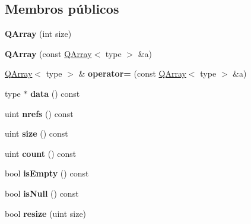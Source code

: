 \subsection*{Membros públicos}
\begin{DoxyCompactItemize}
\item 
\hypertarget{class_q_array_a648f25165a71f521aa5c9252ee535d8a}{{\bfseries Q\-Array} (int size)}\label{class_q_array_a648f25165a71f521aa5c9252ee535d8a}

\item 
\hypertarget{class_q_array_ad627fde1911b655d4c9e68703cb0a1d6}{{\bfseries Q\-Array} (const \hyperlink{class_q_array}{Q\-Array}$<$ type $>$ \&a)}\label{class_q_array_ad627fde1911b655d4c9e68703cb0a1d6}

\item 
\hypertarget{class_q_array_ad2ca538e93e90b600512b84d081164c6}{\hyperlink{class_q_array}{Q\-Array}$<$ type $>$ \& {\bfseries operator=} (const \hyperlink{class_q_array}{Q\-Array}$<$ type $>$ \&a)}\label{class_q_array_ad2ca538e93e90b600512b84d081164c6}

\item 
\hypertarget{class_q_array_a3c89c9a75d2ce89c64d6e209da7d0982}{type $\ast$ {\bfseries data} () const }\label{class_q_array_a3c89c9a75d2ce89c64d6e209da7d0982}

\item 
\hypertarget{class_q_array_af039b996f5fd2708ee64084d6e867649}{uint {\bfseries nrefs} () const }\label{class_q_array_af039b996f5fd2708ee64084d6e867649}

\item 
\hypertarget{class_q_array_a7e63723212bed1ca52f0fe57e58b812e}{uint {\bfseries size} () const }\label{class_q_array_a7e63723212bed1ca52f0fe57e58b812e}

\item 
\hypertarget{class_q_array_a774149fc271ebaba2aabcd183a836e8f}{uint {\bfseries count} () const }\label{class_q_array_a774149fc271ebaba2aabcd183a836e8f}

\item 
\hypertarget{class_q_array_a479432127ee77145cc19d6a2d1590821}{bool {\bfseries is\-Empty} () const }\label{class_q_array_a479432127ee77145cc19d6a2d1590821}

\item 
\hypertarget{class_q_array_ac02f2a4d7312eb91f40980adfd4e31b2}{bool {\bfseries is\-Null} () const }\label{class_q_array_ac02f2a4d7312eb91f40980adfd4e31b2}

\item 
\hypertarget{class_q_array_a87fbd3271213ccbe5789ac30908cdddb}{bool {\bfseries resize} (uint size)}\label{class_q_array_a87fbd3271213ccbe5789ac30908cdddb}


\end{DoxyCompactItemize}

